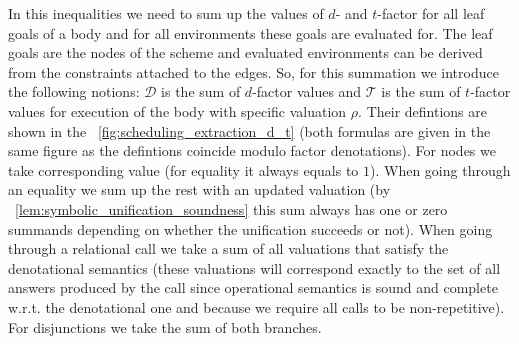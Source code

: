 In this inequalities we need to sum up the values of $d$- and $t$-factor for all leaf goals of a body and for all environments these goals are evaluated for. The leaf goals are
the nodes of the scheme and evaluated environments can be derived from the constraints attached to the edges. So, for this summation we introduce the following notions: $\mathcal{D}$
is the sum of $d$-factor values and $\mathcal{T}$ is the sum of $t$-factor values for execution of the body with specific valuation $\rho$. Their defintions are shown in
the \figureword~\ref{fig:scheduling_extraction_d_t} (both formulas are given in the same figure as the defintions coincide modulo factor denotations). For nodes we take
corresponding value (for equality it always equals to $1$). When going through an equality we sum up the rest with an updated valuation (by \lemmaword~\ref{lem:symbolic_unification_soundness}
this sum always has one or zero summands depending on whether the unification succeeds or not). When going through a relational call we take a sum of all valuations that satisfy the
denotational semantics (these valuations will correspond exactly to the set of all answers produced by the call since operational semantics is sound and complete w.r.t. the denotational
one and because we require all calls to be non-repetitive). For disjunctions we take the sum of both branches.

